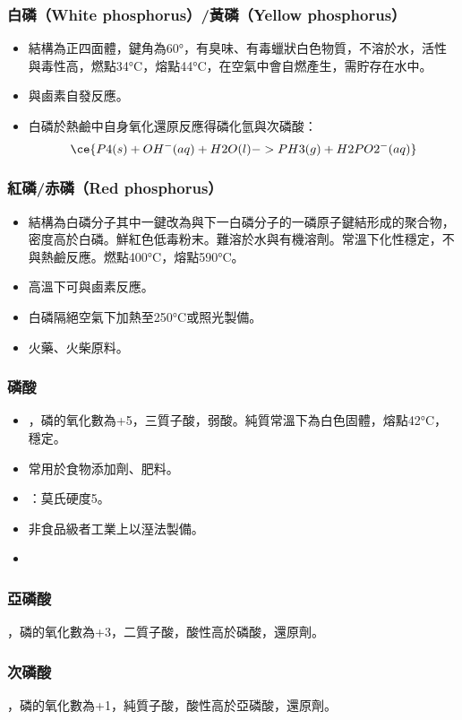 \documentclass[a4paper,12pt]{report}
\begin{document}
\subsubsection{白磷（White phosphorus）/黃磷（Yellow phosphorus）}
\begin{itemize}
\item 結構為正四面體，鍵角為60°，有臭味、有毒蠟狀白色物質，不溶於水，活性與毒性高，燃點34°C，熔點44°C，在空氣中會自燃產生，需貯存在水中。
\item 與鹵素自發反應。
\item 白磷於熱鹼中自身氧化還原反應得磷化氫與次磷酸：
\[\ce{P4(s) + OH^-(aq) + H2O(l) -> PH3(g) + H2PO2^-(aq)}\]
\end{itemize}
\subsubsection{紅磷/赤磷（Red phosphorus）}
\begin{itemize}
\item 結構為白磷分子其中一鍵改為與下一白磷分子的一磷原子鍵結形成的聚合物，密度高於白磷。鮮紅色低毒粉末。難溶於水與有機溶劑。常溫下化性穩定，不與熱鹼反應。燃點400°C，熔點590°C。
\item 高溫下可與鹵素反應。
\item 白磷隔絕空氣下加熱至250°C或照光製備。
\item 火藥、火柴原料。
\end{itemize}
\subsubsection{磷酸}
\begin{itemize}
\item {}，磷的氧化數為+5，三質子酸，弱酸。純質常溫下為白色固體，熔點42°C，穩定。
\item 常用於食物添加劑、肥料。
\item {}：莫氏硬度5。
\item 非食品級者工業上以溼法製備。
\item 
\end{itemize}
\subsubsection{亞磷酸}
，磷的氧化數為+3，二質子酸，酸性高於磷酸，還原劑。
\subsubsection{次磷酸}
，磷的氧化數為+1，純質子酸，酸性高於亞磷酸，還原劑。
\end{document}
